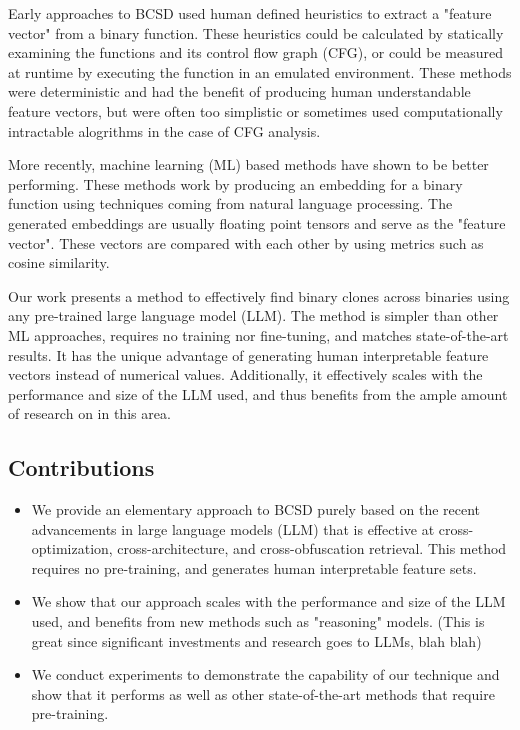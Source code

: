 \documentclass[conference,compsoc]{IEEEtran}
\begin{document}
Early approaches to BCSD used human defined heuristics to extract a "feature vector" from a binary function. These heuristics
could be calculated by statically examining the functions and its control flow graph (CFG), or could be measured at runtime
by executing the function in an emulated environment. These methods were deterministic and had the benefit of producing
human understandable feature vectors, but were often too simplistic or sometimes used computationally intractable alogrithms in
the case of CFG analysis.

More recently, machine learning (ML) based methods have shown to be better performing.
These methods work by producing an embedding for a binary function using techniques coming from natural language processing.
The generated embeddings are usually floating point tensors and serve as the "feature vector". These vectors are compared
with each other by using metrics such as cosine similarity.

Our work presents a method to effectively find binary clones across binaries using any pre-trained large language model (LLM).
The method is simpler than other ML approaches, requires no training nor fine-tuning, and matches state-of-the-art results.
It has the unique advantage of generating human interpretable feature vectors instead of numerical values. Additionally,
it effectively scales with the performance and size of the LLM used, and thus benefits from the ample amount of research
on in this area.

\subsection{Contributions}

\begin{itemize}
\item We provide an elementary approach to BCSD purely based on the recent advancements in large language models (LLM) that
    is effective at cross-optimization, cross-architecture, and cross-obfuscation retrieval. This method requires no
    pre-training, and generates human interpretable feature sets.
\item We show that our approach scales with the performance and size of the LLM used, and benefits from new
    methods such as "reasoning" models.  (This is great since significant investments and research goes to LLMs, blah blah)
\item We conduct experiments to demonstrate the capability of our technique and show that it performs as well as other state-of-the-art
    methods that require pre-training.
\end{itemize}
\end{document}
